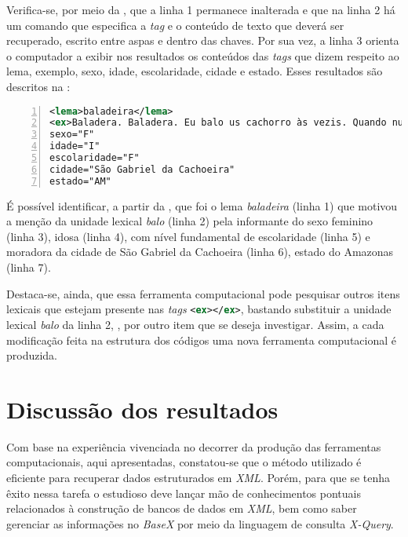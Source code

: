 \documentclass[portuguese]{textolivre}
\begin{document}
Verifica-se, por meio da , que a linha 1 permanece inalterada e que na linha 2 há um comando que especifica a \emph{tag} e o conteúdo de texto que deverá ser recuperado, escrito entre aspas e dentro das chaves. Por sua vez, a linha 3 orienta o computador a exibir nos resultados os conteúdos das \emph{tags} que dizem respeito ao lema, exemplo, sexo, idade, escolaridade, cidade e estado. Esses resultados são descritos na : 


\begin{lstlisting}[language=XML, label=tab09, caption={Resultados das instruções escritas na \Cref{tab08}}, source={Elaboração do autor.}, numbers=left]
<lema>baladeira</lema>
<ex>Baladera. Baladera. Eu balo us cachorro às vezis. Quando num mi deixa durmi. Aí eu saiu i eu balo. Eu tenho uma baladera aí. [risos] Acho qui tá proibido, né? (Ah, é?) Acho que proibiu. Federal proibiu. Qui num tem qui vendê nu supermercado. (Mas tá na casa da genti, né...) Ah, us cachorro num tão mi deixando durmi. Aí eu balo us cachorro.</ex>
sexo="F"
idade="I"
escolaridade="F"
cidade="São Gabriel da Cachoeira"
estado="AM"
\end{lstlisting} %


É possível identificar, a partir da , que foi o lema \emph{baladeira} (linha 1) que motivou a menção da unidade lexical \emph{balo} (linha 2) pela informante do sexo feminino (linha 3), idosa (linha 4), com nível fundamental de escolaridade (linha 5) e moradora da cidade de São Gabriel da Cachoeira (linha 6), estado do Amazonas (linha 7). 

Destaca-se, ainda, que essa ferramenta computacional pode pesquisar outros itens lexicais que estejam presente nas \emph{tags} \lstinline[language=XML]!<ex></ex>!, bastando substituir a unidade lexical \textit{balo} da linha 2, , por outro item que se deseja investigar. Assim, a cada modificação feita na estrutura dos códigos uma nova ferramenta computacional é produzida.

\section{Discussão dos resultados}
Com base na experiência vivenciada no decorrer da produção das ferramentas computacionais, aqui apresentadas, constatou-se que o método utilizado é eficiente para recuperar dados estruturados em \emph{XML}. Porém, para que se tenha êxito nessa tarefa o estudioso deve lançar mão de conhecimentos pontuais relacionados à construção de bancos de dados em \emph{XML}, bem como saber gerenciar as informações no \emph{BaseX} por meio da linguagem de consulta \emph{X-Query}. 
\end{document}
